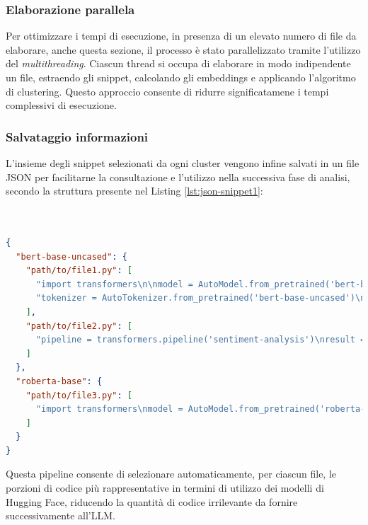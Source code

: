 \documentclass{article}
\begin{document}
\subsubsection{Elaborazione parallela}
Per ottimizzare i tempi di esecuzione, in presenza di un elevato numero di file da elaborare, anche questa sezione, il processo è stato parallelizzato tramite l’utilizzo del \textit{multithreading}. Ciascun thread si occupa di elaborare in modo indipendente un file, estraendo gli snippet, calcolando gli embeddings e applicando l’algoritmo di clustering. Questo approccio consente di ridurre significatamene i tempi complessivi di esecuzione.

\subsubsection{Salvataggio informazioni}
L'insieme degli snippet selezionati da ogni cluster vengono infine salvati in un file JSON per facilitarne la consultazione e l’utilizzo nella successiva fase di analisi, secondo la struttura presente nel Listing \ref{lst:json-snippet1}:\\\\\\
\begin{lstlisting}[language=json, caption={Esempio di struttura JSON dei migliori snippet selezionati}, label={lst:json-snippet1}]
{
  "bert-base-uncased": {
    "path/to/file1.py": [
      "import transformers\n\nmodel = AutoModel.from_pretrained('bert-base-uncased')",
      "tokenizer = AutoTokenizer.from_pretrained('bert-base-uncased')\ninputs = tokenizer('Hello world', return_tensors='pt')"
    ],
    "path/to/file2.py": [
      "pipeline = transformers.pipeline('sentiment-analysis')\nresult = pipeline('I love coding!')"
    ]
  },
  "roberta-base": {
    "path/to/file3.py": [
      "import transformers\nmodel = AutoModel.from_pretrained('roberta-base')"
    ]
  }
}
\end{lstlisting}
Questa pipeline consente di selezionare automaticamente, per ciascun file, le porzioni di codice più rappresentative in termini di utilizzo dei modelli di Hugging Face, riducendo la quantità di codice irrilevante da fornire successivamente all'LLM.
\end{document}
